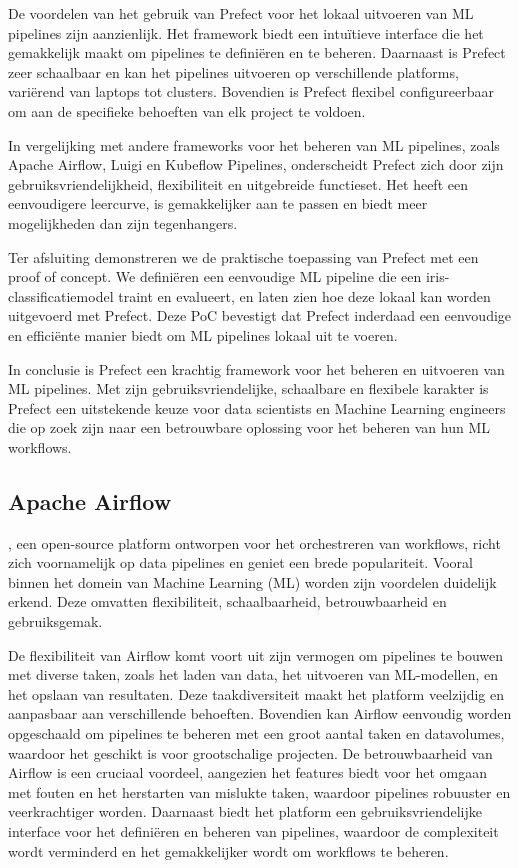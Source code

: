 De voordelen van het gebruik van Prefect voor het lokaal uitvoeren van ML pipelines zijn aanzienlijk. Het framework biedt een intuïtieve interface die het gemakkelijk maakt om pipelines te definiëren en te beheren. Daarnaast is Prefect zeer schaalbaar en kan het pipelines uitvoeren op verschillende platforms, variërend van laptops tot clusters. Bovendien is Prefect flexibel configureerbaar om aan de specifieke behoeften van elk project te voldoen.

In vergelijking met andere frameworks voor het beheren van ML pipelines, zoals Apache Airflow, Luigi en Kubeflow Pipelines, onderscheidt Prefect zich door zijn gebruiksvriendelijkheid, flexibiliteit en uitgebreide functieset. Het heeft een eenvoudigere leercurve, is gemakkelijker aan te passen en biedt meer mogelijkheden dan zijn tegenhangers.

Ter afsluiting demonstreren we de praktische toepassing van Prefect met een proof of concept. We definiëren een eenvoudige ML pipeline die een iris-classificatiemodel traint en evalueert, en laten zien hoe deze lokaal kan worden uitgevoerd met Prefect. Deze PoC bevestigt dat Prefect inderdaad een eenvoudige en efficiënte manier biedt om ML pipelines lokaal uit te voeren.

In conclusie is Prefect een krachtig framework voor het beheren en uitvoeren van ML pipelines. Met zijn gebruiksvriendelijke, schaalbare en flexibele karakter is Prefect een uitstekende keuze voor data scientists en Machine Learning engineers die op zoek zijn naar een betrouwbare oplossing voor het beheren van hun ML workflows.

\subsection{Apache Airflow}

\autocite{ApacheAirflow2024}, een open-source platform ontworpen voor het orchestreren van workflows, richt zich voornamelijk op data pipelines en geniet een brede populariteit. Vooral binnen het domein van Machine Learning (ML) worden zijn voordelen duidelijk erkend. Deze omvatten flexibiliteit, schaalbaarheid, betrouwbaarheid en gebruiksgemak.

De flexibiliteit van Airflow komt voort uit zijn vermogen om pipelines te bouwen met diverse taken, zoals het laden van data, het uitvoeren van ML-modellen, en het opslaan van resultaten. Deze taakdiversiteit maakt het platform veelzijdig en aanpasbaar aan verschillende behoeften. Bovendien kan Airflow eenvoudig worden opgeschaald om pipelines te beheren met een groot aantal taken en datavolumes, waardoor het geschikt is voor grootschalige projecten. De betrouwbaarheid van Airflow is een cruciaal voordeel, aangezien het features biedt voor het omgaan met fouten en het herstarten van mislukte taken, waardoor pipelines robuuster en veerkrachtiger worden. Daarnaast biedt het platform een gebruiksvriendelijke interface voor het definiëren en beheren van pipelines, waardoor de complexiteit wordt verminderd en het gemakkelijker wordt om workflows te beheren.

